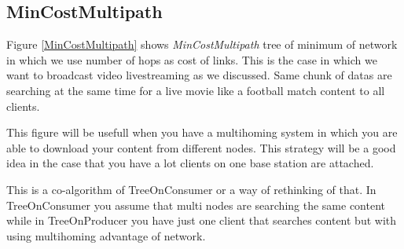 \subsection{MinCostMultipath}
Figure \ref{MinCostMultipath} shows \textit{MinCostMultipath} tree of minimum of network in which we use number of hops as cost of links. This is the case in which we want to broadcast video livestreaming as we discussed. Same chunk of datas are searching at the same time for a live movie like a football match content to all clients.


This figure will be usefull when you have a multihoming system in which you are able to download your content from different nodes. This strategy will be a good idea in the case that you have a lot clients on one base station are attached.

This is a co-algorithm of TreeOnConsumer or a way of rethinking of that. In TreeOnConsumer you assume that multi nodes are searching the same content while in TreeOnProducer you have just one client that searches content but with using multihoming advantage of network. 

